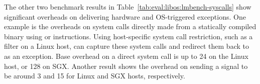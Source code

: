The other two benchmark results in Table~\ref{tab:eval:libos:lmbench-syscalls}
show significant overheads
on delivering hardware and OS-triggered exceptions.
One example
is the overheads on system calls directly made from a statically compiled binary
using  or  instructions.
Using host-specific system call restriction,
such as a \seccomp{} filter
on a Linux host,
\graphene{} can capture these system calls %
and redirect them back to \thelibos{} as an exception. %
Base overhead on a direct system call
is up to 24\x{} on the Linux host, or 128\x{} on SGX.
Another result shows the overhead on
sending a  signal
to be around 3\x{} and 15\x{} for Linux and SGX hosts, respectively.















